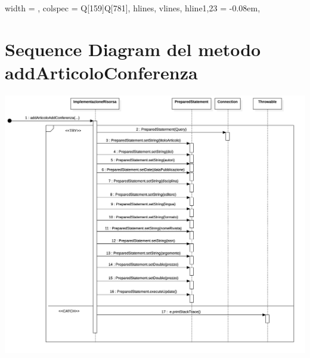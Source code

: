 \begin{longtblr}[
    label = none,
    entry = none,
  ]{
    width = \linewidth,
    colspec = {Q[159]Q[781]},
    hlines,
    vlines,
    hline{1,23} = {-}{0.08em},
  }
                                                                                                                                                                                                                                                                                                                                                                                                                                                                                                                                                                                                                                                                                                                                                                                                                                                                                                              
  \end{longtblr}


\section{Sequence Diagram del metodo addArticoloConferenza}
\includegraphics[scale=0.15, center]{Immagini/AddArtConf_SD.png}

